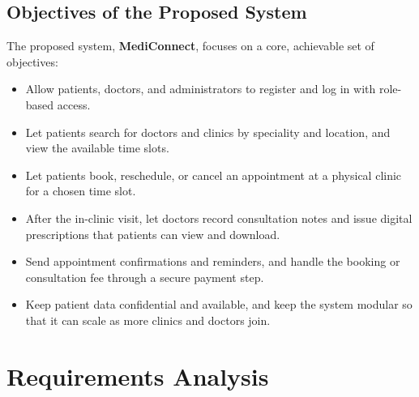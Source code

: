 \documentclass[12pt,a4paper]{article}
\begin{document}
\subsection{Objectives of the Proposed System}
The proposed system, \textbf{MediConnect}, focuses on a core, achievable set of objectives:
\begin{itemize}[leftmargin=1.4em,itemsep=2pt]
  \item Allow patients, doctors, and administrators to register and log in with role-based
        access.
  \item Let patients search for doctors and clinics by speciality and location, and view the
        available time slots.
  \item Let patients book, reschedule, or cancel an appointment at a physical clinic for a
        chosen time slot.
  \item After the in-clinic visit, let doctors record consultation notes and issue digital
        prescriptions that patients can view and download.
  \item Send appointment confirmations and reminders, and handle the booking or consultation
        fee through a secure payment step.
  \item Keep patient data confidential and available, and keep the system modular so that it
        can scale as more clinics and doctors join.
\end{itemize}

\section{Requirements Analysis}
\end{document}

